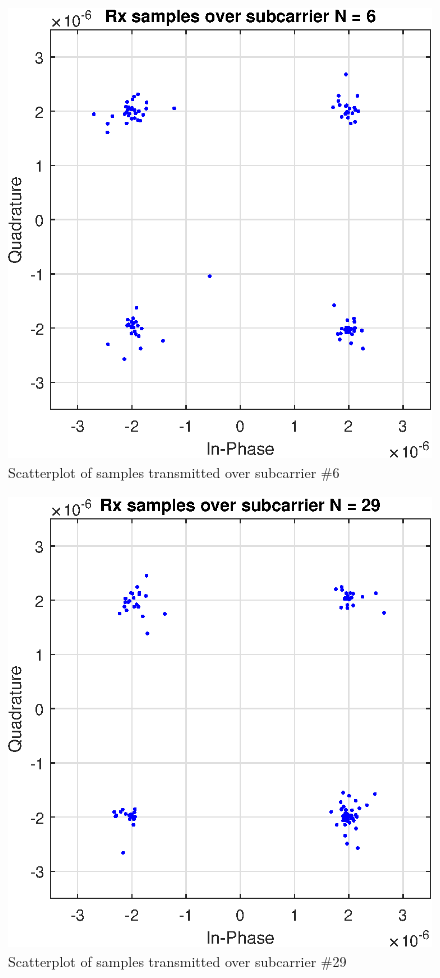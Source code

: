 \documentclass[conference]{IEEEtran}
\begin{document}
\begin{appendices}
\begin{figure}[H]
    \centering
    \includegraphics[width=\linewidth]{images/ScatterN6.eps}
    \caption{Scatterplot of samples transmitted over subcarrier \#6}
    \label{N6}
\end{figure}

\begin{figure}[H]
    \centering
    \includegraphics[width=\linewidth]{images/ScatterN29.eps}
    \caption{Scatterplot of samples transmitted over subcarrier \#29}
    \label{N29}
\end{figure}


\end{appendices}
\end{document}

